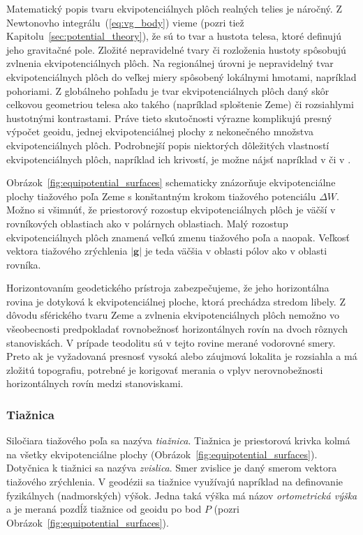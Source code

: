 \documentclass[a4paper, 12pt]{book}
\let\vec\mathbf
\begin{document}
Matematický popis tvaru ekvipotenciálnych plôch realných telies je náročný.  
Z Newtonovho integrálu~(\ref{eq:vg_body}) vieme (pozri tiež 
Kapitolu~\ref{sec:potential_theory}), že sú to tvar a hustota telesa, ktoré 
definujú jeho gravitačné pole.  Zložité nepravidelné tvary či rozloženia 
hustoty spôsobujú zvlnenia ekvipotenciálnych plôch.  Na regionálnej úrovni je 
nepravidelný tvar ekvipotenciálnych plôch do veľkej miery spôsobený lokálnymi 
hmotami, napríklad pohoriami.  Z globálneho pohľadu je tvar ekvipotenciálnych 
plôch daný skôr celkovou geometriou telesa ako takého (napríklad sploštenie 
Zeme) či rozsiahlymi hustotnými kontrastami.  Práve tieto skutočnosti výrazne 
komplikujú presný výpočet geoidu, jednej ekvipotenciálnej plochy z nekonečného 
množstva ekvipotenciálnych plôch.  Podrobnejší popis niektorých dôležitých 
vlastností ekvipotenciálnych plôch, napríklad ich krivostí, je možne nájsť 
napríklad v \cite{Janak2006} či v \cite{MoritzPhysicalGeodesy}.

Obrázok~\ref{fig:equipotential_surfaces} schematicky znázorňuje ekvipotenciálne 
plochy tiažového poľa Zeme s konštantným krokom tiažového potenciálu $\Delta 
W$.  Možno si všimnúť, že priestorový rozostup ekvipotenciálnych plôch je väčší 
v rovníkových oblastiach ako v polárnych oblastiach.  Malý rozostup 
ekvipotenciálnych plôch znamená veľkú zmenu tiažového poľa a naopak.  Veľkosť 
vektora tiažového zrýchlenia $| \vec g |$ je teda väčšia v oblasti pólov ako 
v oblasti rovníka.

Horizontovaním geodetického prístroja zabezpečujeme, že jeho horizontálna 
rovina je dotyková k ekvipotenciálnej ploche, ktorá prechádza stredom libely.  
Z dôvodu sférického tvaru Zeme a zvlnenia ekvipotenciálnych plôch nemožno vo 
všeobecnosti predpokladať rovnobežnosť horizontálnych rovín na dvoch rôznych 
stanoviskách.  V prípade teodolitu sú v tejto rovine merané vodorovné smery.  
Preto ak je vyžadovaná presnosť vysoká alebo záujmová lokalita je rozsiahla 
a má zložitú topografiu, potrebné je korigovať merania o vplyv nerovnobežnosti 
horizontálnych rovín medzi stanoviskami.

\subsubsection{Tiažnica}

Siločiara tiažového poľa sa nazýva \emph{tiažnica}.  Tiažnica je priestorová 
krivka kolmá na všetky ekvipotenciálne plochy 
(Obrázok~\ref{fig:equipotential_surfaces}).  Dotyčnica k tiažnici sa nazýva 
\emph{zvislica}.  Smer zvislice je daný smerom vektora tiažového zrýchlenia.  
V geodézii sa tiažnice využívajú napríklad na definovanie fyzikálnych 
(nadmorských) výšok.  Jedna taká výška má názov \emph{ortometrická výška} a je 
meraná pozdĺž tiažnice od geoidu po bod $P$ (pozri 
Obrázok~\ref{fig:equipotential_surfaces}).
\end{document}
